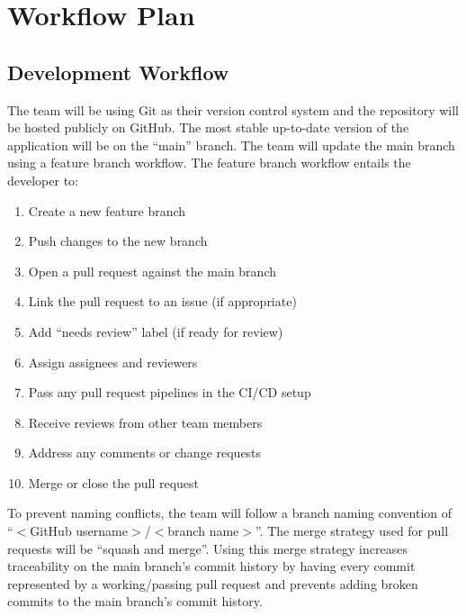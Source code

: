 \documentclass{article}
\begin{document}
\section{Workflow Plan}


\subsection{Development Workflow}

The team will be using Git as their version control system and the repository will be hosted
publicly on GitHub. The most stable up-to-date version of the application will be on the ``main''
branch. The team will update the main branch using a feature branch workflow. The feature branch
workflow entails the developer to:

\begin{enumerate}
	\item Create a new feature branch
	\item Push changes to the new branch
	\item Open a pull request against the main branch
	\item Link the pull request to an issue (if appropriate)
	\item Add ``needs review'' label (if ready for review)
	\item Assign assignees and reviewers
	\item Pass any pull request pipelines in the CI/CD setup
	\item Receive reviews from other team members
	\item Address any comments or change requests
	\item Merge or close the pull request
\end{enumerate}

To prevent naming conflicts, the team will follow a branch naming convention of ``$<$GitHub
username$>$/$<$branch name$>$''. The merge strategy used for pull requests will be ``squash and
merge''. Using this merge strategy increases traceability on the main branch's commit history by
having every commit represented by a working/passing pull request and prevents adding broken
commits to the main branch's commit history.
\end{document}
